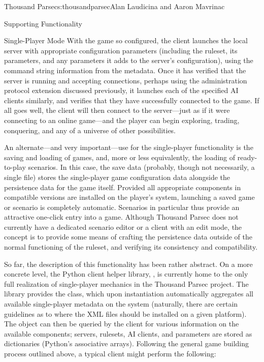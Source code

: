 \begin{aosachapter}{Thousand Parsec}{s:thousandparsec}{Alan Laudicina and Aaron Mavrinac}
\begin{aosasect1}{Supporting Functionality}
\begin{aosasect2}{Single-Player Mode}
With the game so configured, the client launches the local server with
appropriate configuration parameters (including the ruleset, its
parameters, and any parameters it adds to the server's configuration),
using the command string information from the metadata. Once it has
verified that the server is running and accepting connections, perhaps
using the administration protocol extension discussed previously, it
launches each of the specified AI clients similarly, and verifies that
they have successfully connected to the game. If all goes well, the
client will then connect to the server---just as if it were connecting
to an online game---and the player can begin exploring, trading,
conquering, and any of a universe of other possibilities.

An alternate---and very important---use for the single-player
functionality is the saving and loading of games, and, more or less
equivalently, the loading of ready-to-play scenarios. In this case,
the save data (probably, though not necessarily, a single file) stores
the single-player game configuration data alongside the persistence
data for the game itself. Provided all appropriate components in
compatible versions are installed on the player's system, launching a
saved game or scenario is completely automatic. Scenarios in
particular thus provide an attractive one-click entry into a
game. Although Thousand Parsec does not currently have a dedicated
scenario editor or a client with an edit mode, the concept is to
provide some means of crafting the persistence data outside of the
normal functioning of the ruleset, and verifying its consistency and
compatibility.

So far, the description of this functionality has been rather
abstract. On a more concrete level, the Python client helper library,
, is currently home to the only full realization
of single-player mechanics in the Thousand Parsec project. The library
provides the  class, which upon instantiation
automatically aggregates all available single-player metadata on the
system (naturally, there are certain guidelines as to where the XML
files should be installed on a given platform). The object can then be
queried by the client for various information on the available
components; servers, rulesets, AI clients, and parameters are stored
as dictionaries (Python's associative arrays). Following the general
game building process outlined above, a typical client might perform
the following:

\begin{aosaenumerate}


\end{aosaenumerate}
\end{aosasect2}
\end{aosasect1}
\end{aosachapter}
